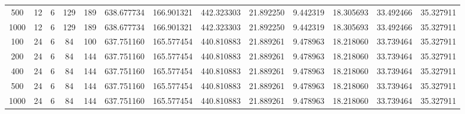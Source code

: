 \begin{table}[h]
\begin{tabular}{ccccccccccccc}
500 & 12 & 6 & 129 & 189 & 638.677734 & 166.901321 & 442.323303 & 21.892250 & 9.442319 & 18.305693 & 33.492466 & 35.327911 \\
1000 & 12 & 6 & 129 & 189 & 638.677734 & 166.901321 & 442.323303 & 21.892250 & 9.442319 & 18.305693 & 33.492466 & 35.327911 \\
100 & 24 & 6 & 84 & 100 & 637.751160 & 165.577454 & 440.810883 & 21.889261 & 9.478963 & 18.218060 & 33.739464 & 35.327911 \\
200 & 24 & 6 & 84 & 144 & 637.751160 & 165.577454 & 440.810883 & 21.889261 & 9.478963 & 18.218060 & 33.739464 & 35.327911 \\
400 & 24 & 6 & 84 & 144 & 637.751160 & 165.577454 & 440.810883 & 21.889261 & 9.478963 & 18.218060 & 33.739464 & 35.327911 \\
500 & 24 & 6 & 84 & 144 & 637.751160 & 165.577454 & 440.810883 & 21.889261 & 9.478963 & 18.218060 & 33.739464 & 35.327911 \\
1000 & 24 & 6 & 84 & 144 & 637.751160 & 165.577454 & 440.810883 & 21.889261 & 9.478963 & 18.218060 & 33.739464 & 35.327911 \\
\bottomrule
\end{tabular}
\end{table}
